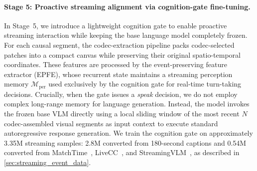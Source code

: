 

\paragraph{Stage 5: Proactive streaming alignment via cognition-gate fine-tuning.}
In Stage~5, we introduce a lightweight cognition gate to enable proactive streaming interaction while keeping the base language model completely frozen. For each causal segment, the codec-extraction pipeline packs codec-selected patches into a compact canvas while preserving their original spatio-temporal coordinates. These features are processed by the event-preserving feature extractor (EPFE), whose recurrent state maintains a streaming perception memory $\mathcal{M}_{\mathrm{per}}$ used exclusively by the cognition gate for real-time turn-taking decisions. Crucially, when the gate issues a \emph{speak} decision, we do not employ complex long-range memory for language generation. Instead, the model invokes the frozen base VLM directly using a local sliding window of the most recent $N$ codec-assembled visual segments as input context to execute standard autoregressive response generation. We train the cognition gate on approximately 3.35M streaming samples: 2.8M converted from 180-second captions and 0.54M converted from MatchTime~\citep{rao2024matchtimeautomaticsoccergame}, LiveCC~\citep{chen2025livecclearningvideollm}, and StreamingVLM~\citep{xu2026streamingvlmrealtimeunderstandinginfinite}, as described in \cref{sec:streaming_event_data}.

